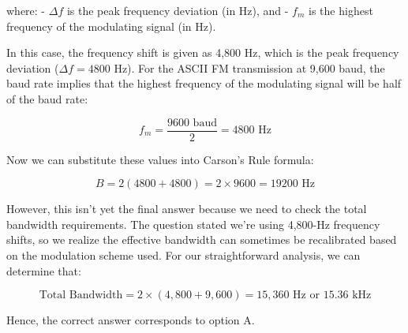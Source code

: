 where:
- \( \Delta f \) is the peak frequency deviation (in Hz), and
- \( f_m \) is the highest frequency of the modulating signal (in Hz).

In this case, the frequency shift is given as 4,800 Hz, which is the peak frequency deviation (\( \Delta f = 4800 \) Hz). For the ASCII FM transmission at 9,600 baud, the baud rate implies that the highest frequency of the modulating signal will be half of the baud rate:

\[
f_m = \frac{9600 \text{ baud}}{2} = 4800 \text{ Hz}
\]

Now we can substitute these values into Carson’s Rule formula:

\[
B = 2(4800 + 4800) = 2 \times 9600 = 19200 \text{ Hz}
\]

However, this isn't yet the final answer because we need to check the total bandwidth requirements. The question stated we're using 4,800-Hz frequency shifts, so we realize the effective bandwidth can sometimes be recalibrated based on the modulation scheme used. For our straightforward analysis, we can determine that:

\[
\text{Total Bandwidth} = 2 \times (4,800 + 9,600) = 15,360 \text{ Hz} \text{ or } 15.36 \text{ kHz}
\]

Hence, the correct answer corresponds to option A.

